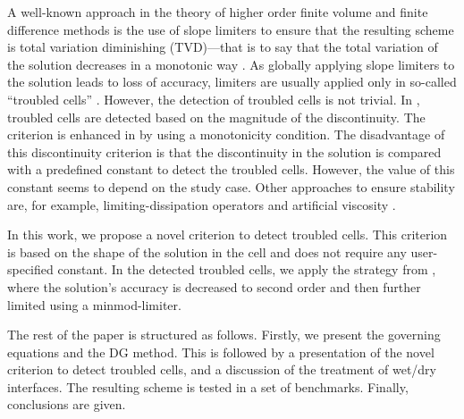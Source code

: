 A well-known approach in the theory of higher order finite volume and
finite difference methods is the use of slope limiters to ensure that
the resulting scheme is total variation diminishing (TVD)---that is to
say that the total variation of the solution decreases in a monotonic
way \cite{leveque2}.  As globally applying slope limiters to the
solution leads to loss of accuracy, limiters are usually applied only
in so-called ``troubled cells'' \cite{krivodonova2004, shu2005}.
However, the detection of troubled cells is not trivial.  In
\cite{Ambati2007452, krivodonova2004}, troubled cells are detected
based on the magnitude of the discontinuity. The criterion is enhanced
in \cite{kesserwani2015} by using a monotonicity condition.  The
disadvantage of this discontinuity criterion is that the discontinuity
in the solution is compared with a predefined constant to detect the
troubled cells. However, the value of this constant seems to depend on
the study case.  Other approaches to ensure stability are, for
example, limiting-dissipation operators \cite{JAFFRE1995,
  Ambati2007452} and artificial viscosity \cite{cesenek2013,
  bublik2011, Bublik2015329}.

In this work, we propose a novel criterion to detect troubled cells.
This criterion is based on the shape of the solution in the cell and
does not require any user-specified constant.  In the detected
troubled cells, we apply the strategy from \cite{Cockburn1989b}, where
the solution's accuracy is decreased to second order and then further
limited using a minmod-limiter.

The rest of the paper is structured as follows.  Firstly, we present
the governing equations and the DG method.  This is followed by a
presentation of the novel criterion to detect troubled cells, and a
discussion of the treatment of wet/dry interfaces.  The resulting
scheme is tested in a set of benchmarks.  Finally, conclusions are
given.
